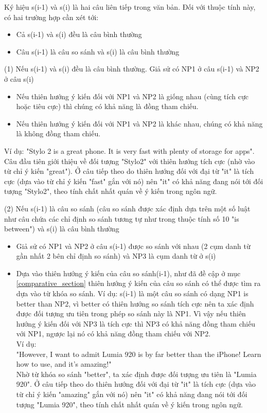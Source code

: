 \documentclass[12pt]{report}
\begin{document}
				\par Ký hiệu s(i-1) và s(i) là hai câu liên tiếp trong văn bản. Đối với thuộc tính này, có hai trường hợp cần xét tới:
					\begin{itemize}
						\item{Cả s(i-1) và s(i) đều là câu bình thường}
						\item{Câu s(i-1) là câu so sánh và s(i) là câu bình thường}
					\end{itemize}
				\par (1) Nếu s(i-1) và s(i) đều là câu bình thường. Giả sử có NP1 ở câu s(i-1) và NP2 ở câu s(i)
				\begin{itemize}
					\item{Nếu thiên hướng ý kiến đối với NP1 và NP2 là giống nhau (cùng tích cực hoặc tiêu cực) thì chúng có khả năng là đồng tham chiếu.}
					\item{Nếu thiên hướng ý kiến đối với NP1 và NP2 là khác nhau, chúng có khả năng là không đồng tham chiếu.}
				\end{itemize}
				\par Ví dụ: "Stylo 2 is a great phone. It is very fast with plenty of storage for apps".
					\\Câu đầu tiên giới thiệu về đối tượng "Stylo2" với thiên hướng tích cực (nhờ vào từ chỉ ý kiến "great"). Ở câu tiếp theo do thiên hướng đối với đại từ "it" là tích cực (dựa vào từ chỉ ý kiến "fast" gắn với nó) nên "it" có khả năng đang nói tới đối tượng "Stylo2", theo tính chất nhất quán về ý kiến trong ngôn ngữ.
				\par (2) Nếu s(i-1) là câu so sánh (câu so sánh được xác định dựa trên một số luật như câu chứa các chỉ định so sánh tương tự như trong thuộc tính số 10 "is between") và s(i) là câu bình thường
				\begin{itemize}
					\item{Giả sử có NP1 và NP2 ở câu s(i-1) được so sánh với nhau (2 cụm danh từ gần nhất 2 bên chỉ định so sánh) và NP3 là cụm danh từ ở s(i)}
					\item{Dựa vào thiên hướng ý kiến của câu so sánh(i-1), như đã đề cập ở mục \ref{comparative_section} thiên hướng ý kiến của câu so sánh có thể được tìm ra dựa vào từ khóa so sánh. Ví dụ: s(i-1) là một câu so sánh có dạng NP1 is better than NP2, vì better có thiên hướng so sánh tích cực nên ta xác định được đối tượng ưu tiên trong phép so sánh này là NP1. Vì vậy nếu thiên hướng ý kiến đối với NP3 là tích cực thì NP3 có khả năng đồng tham chiếu với NP1, ngược lại nó có khả năng đồng tham chiếu với NP2.
					\\ Ví dụ:
					\\"However, I want to admit Lumia 920 is by far better than the iPhone! Learn how to use, and it's amazing!" 
					\\Nhờ từ khóa so sánh "better", ta xác định được đối tượng ưu tiên là "Lumia 920". Ở câu tiếp theo do thiên hướng đối với đại từ "it" là tích cực (dựa vào từ chỉ ý kiến "amazing" gắn với nó) nên "it" có khả năng đang nói tới đối tượng "Lumia 920", theo tính chất nhất quán về ý kiến trong ngôn ngữ.}
				\end{itemize}
\end{document}
